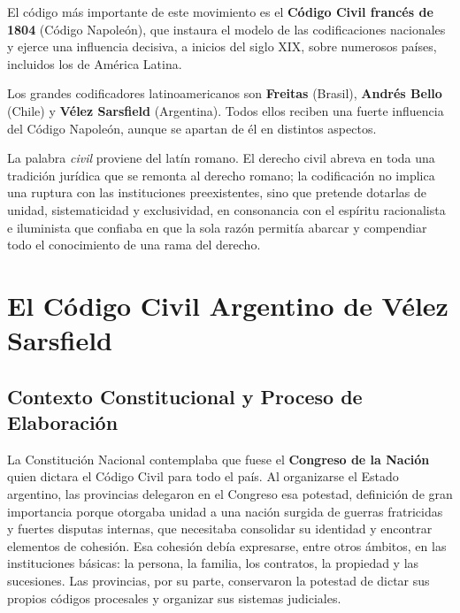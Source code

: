 \documentclass[12pt,oneside]{book}
\begin{document}
El código más importante de este movimiento es el \textbf{Código Civil francés de 1804} (Código Napoleón), que instaura el modelo de las codificaciones nacionales y ejerce una influencia decisiva, a inicios del siglo XIX, sobre numerosos países, incluidos los de América Latina.

Los grandes codificadores latinoamericanos son \textbf{Freitas} (Brasil), \textbf{Andrés Bello} (Chile) y \textbf{Vélez Sarsfield} (Argentina). Todos ellos reciben una fuerte influencia del Código Napoleón, aunque se apartan de él en distintos aspectos.

\begin{note}
La palabra \textit{civil} proviene del latín romano. El derecho civil abreva en toda una tradición jurídica que se remonta al derecho romano; la codificación no implica una ruptura con las instituciones preexistentes, sino que pretende dotarlas de unidad, sistematicidad y exclusividad, en consonancia con el espíritu racionalista e iluminista que confiaba en que la sola razón permitía abarcar y compendiar todo el conocimiento de una rama del derecho.
\end{note}


\chapter{El Código Civil Argentino de Vélez Sarsfield}

\section{Contexto Constitucional y Proceso de Elaboración}

La Constitución Nacional contemplaba que fuese el \textbf{Congreso de la Nación} quien dictara el Código Civil para todo el país. Al organizarse el Estado argentino, las provincias delegaron en el Congreso esa potestad, definición de gran importancia porque otorgaba unidad a una nación surgida de guerras fratricidas y fuertes disputas internas, que necesitaba consolidar su identidad y encontrar elementos de cohesión. Esa cohesión debía expresarse, entre otros ámbitos, en las instituciones básicas: la persona, la familia, los contratos, la propiedad y las sucesiones. Las provincias, por su parte, conservaron la potestad de dictar sus propios códigos procesales y organizar sus sistemas judiciales.
\end{document}
